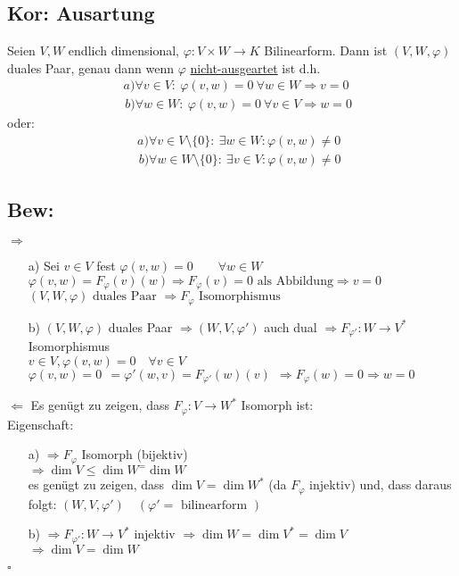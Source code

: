 \documentclass[titlepage,12pt,a4paper,ngerman]{report}
\newcommand{\tx}[1]{\textrm{#1}}
\begin{document}
\subsection{Kor: Ausartung}
Seien $V,W$ endlich dimensional, $\varphi:V \times W \to K$ Bilinearform. Dann ist $(V,W,\varphi)$ duales Paar, genau dann wenn $\varphi$ \underline{nicht-ausgeartet} ist d.h.
\begin{align*}
&\,a) \forall v \in V:\ \varphi(v,w) = 0\ \forall w \in W \Rightarrow v = 0 \\
&\;b) \forall w \in W:\ \varphi(v,w) = 0\ \forall v \in V \Rightarrow w = 0
\end{align*}
oder:
\begin{align*}
&\,a) \forall v \in V \setminus\{0\} :\ \exists w \in W : \varphi(v,w) \neq 0\\\
&\;b) \forall w \in W \setminus\{0\} :\ \exists v \in V : \varphi(v,w) \neq 0
\end{align*}
\subsection{Bew:}
$\boxed{\Rightarrow}$
\begin{itemize}
	\item[a)] Sei $  v\in V $ fest $ \varphi(v,w) = 0 \qquad \forall w \in W $\\
	$ \varphi (v,w) = F _{\varphi} (v)(w) \Rightarrow F_{\varphi} (v) = 0  \tx{ als Abbildung} \Rightarrow v = 0$\\
	$ (V,W,\varphi) \tx{ duales Paar } \Rightarrow F_{\varphi} \tx{ Isomorphismus } $
	\item[b)] $ (V,W,\varphi) $ duales Paar $ \Rightarrow (W,V,\varphi') $ auch dual $ \Rightarrow F_{\varphi'}: W \to V^* $ Isomorphismus\\
	$ v\in V , \varphi(v,w) = 0 \quad \forall v \in V $\\
	$ \varphi(v,w) = 0 \ \ = \varphi'(w,v) = F_{\varphi'} (w)(v) \ \ \Rightarrow F_{\varphi}(w) = 0 \Rightarrow w = 0 $
\end{itemize}
$ \boxed{\Leftarrow} $ Es genügt zu zeigen, dass $ F_{\varphi}: V \to W^* $ Isomorph ist: \\
Eigenschaft:
\begin{itemize}
	\item[a)] $ \Rightarrow F_{\varphi} $ Isomorph (bijektiv)\\
	$ \Rightarrow \dim V \le \dim W^ = \dim W $\\
	es genügt zu zeigen, dass $ \dim V = \dim W^* $ (da $ F_{\varphi} $ injektiv)  und, dass daraus folgt: $ (W,V,\varphi') \quad  (\varphi' = \tx{ bilinearform } ) $
	\item[b)] $ \Rightarrow F_{\varphi'}: W \to V^* $ injektiv $ \Rightarrow \dim W = \dim V^* = \dim V $\\
	$ \Rightarrow \dim V = \dim W $
\end{itemize}
\begin{flushright}
	$ \square $
\end{flushright}
\end{document}
